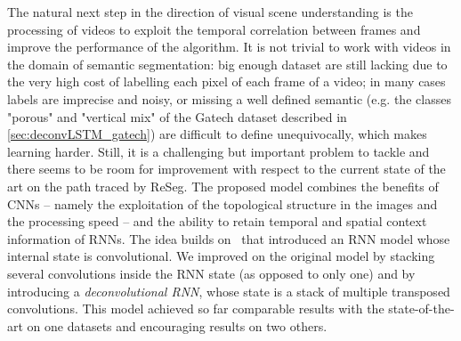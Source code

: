 The natural next step in the direction of visual scene understanding is the
processing of videos to exploit the temporal correlation between frames and
improve the performance of the algorithm. It is not trivial to work with videos
in the domain of semantic segmentation: big enough dataset are still lacking
due to the very high cost of labelling each pixel of each frame of a video; in
many cases labels are imprecise and noisy, or missing a well defined semantic
(e.g. the classes "porous" and "vertical mix" of the Gatech dataset described
in \autoref{sec:deconvLSTM_gatech}) are difficult to define unequivocally,
which makes learning harder. Still, it is a challenging but important problem
to tackle and there seems to be room for improvement with respect to the
current state of the art on the path traced by ReSeg. The proposed model
combines the benefits of CNNs -- namely the exploitation of the topological
structure in the images and the processing speed -- and the ability to retain
temporal and spatial context information of RNNs. The idea builds on~\citep{
    xingjian2015convolutional} that introduced an RNN model whose internal
state is convolutional. We improved on the original model by stacking several
convolutions inside the RNN state (as opposed to only one) and by introducing a
\emph{deconvolutional RNN}, whose state is a stack of multiple transposed
convolutions. This model achieved so far comparable results with the
state-of-the-art on one datasets and encouraging results on two others.



